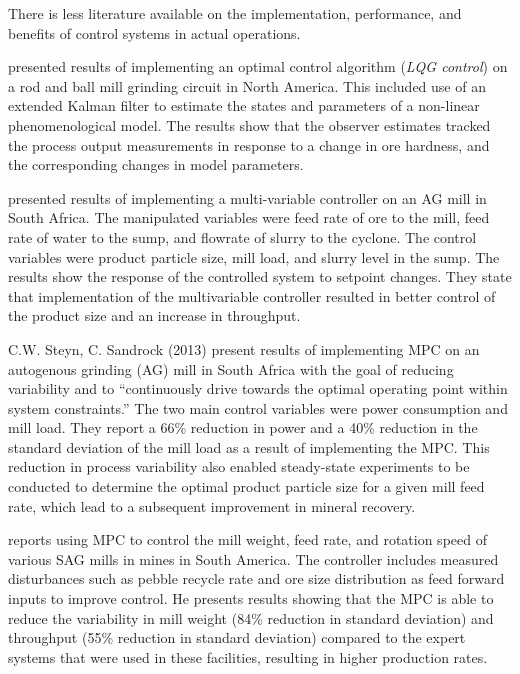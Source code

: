 There is less literature available on the implementation, performance, and benefits of control systems in actual operations.

\cite{herbst_optimal_1988} presented results of implementing an optimal control algorithm (\textit{LQG control}) on a rod and ball mill grinding circuit in North America. This included use of an extended Kalman filter to estimate the states and parameters of a non-linear phenomenological model. The results show that the observer estimates tracked the process output measurements in response to a change in ore hardness, and the corresponding changes in model parameters.

\cite{hulbert_multivariable_1990} presented results of implementing a multi-variable controller on an AG mill in South Africa. The manipulated variables were feed rate of ore to the mill, feed rate of water to the sump, and flowrate of slurry to the cyclone. The control variables were product particle size, mill load, and slurry level in the sump. The results show the response of the controlled system to setpoint changes. They state that implementation of the multivariable controller resulted in better control of the product size and an increase in throughput.

C.W. Steyn, C. Sandrock (2013) present results of implementing MPC on an autogenous grinding (AG) mill in South Africa with the goal of reducing variability and to ``continuously drive towards the optimal operating point within system constraints.'' The two main control variables were power consumption and mill load. They report a 66\% reduction in power and a 40\% reduction in the standard deviation of the mill load as a result of implementing the MPC. This reduction in process variability also enabled steady-state experiments to be conducted to determine the optimal product particle size for a given mill feed rate, which lead to a subsequent improvement in mineral recovery.

\cite{gough_sag_2015} reports using MPC to control the mill weight, feed rate, and rotation speed of various SAG mills in mines in South America. The controller includes measured disturbances such as pebble recycle rate and ore size distribution as feed forward inputs to improve control. He presents results showing that the MPC is able to reduce the variability in mill weight (84\% reduction in standard deviation) and throughput (55\% reduction in standard deviation) compared to the expert systems that were used in these facilities, resulting in higher production rates.

